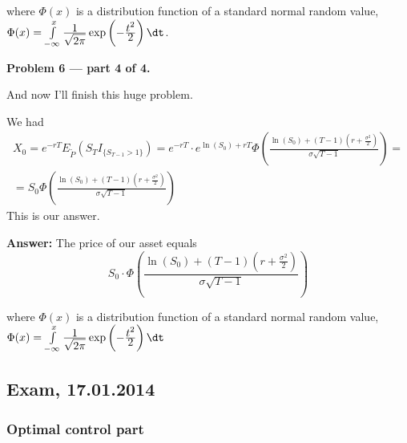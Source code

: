 \documentclass[12pt, a4paper]{article}
\newcommand{\ds}{\displaystyle}
\begin{document}
where $\Phi(x)$ is a distribution function of  a standard normal random value, $\Phi(x) = \int\limits_{-\infty}^{x}\frac{\ds 1}{\ds \sqrt{2\pi}}\exp\left(-\frac{\ds t^{2}}{\ds 2}\right)\dt$.


\textbf{Problem 6 — part 4 of 4.}\par
And now I'll finish this huge problem.\par
We had
\begin{multline}
X_{0} = e^{-rT}E_{\tilde{P}}\left(S_{T}I_{\{S_{T-1}> 1\}}\right) = e^{-rT}\cdot e^{\ln(S_{0}) + rT}\Phi\left(\frac{\ds \ln(S_{0}) + (T-1)\left(r + \frac{\ds \sigma^{2}}{\ds 2}\right)}{\ds \sigma\sqrt{T-1}}\right) = \\
=
S_{0}\Phi\left(\frac{\ds \ln(S_{0}) + (T-1)\left(r + \frac{\ds \sigma^{2}}{\ds 2}\right)}{\ds \sigma\sqrt{T-1}}\right)
\end{multline}
This is our answer.

\textbf{Answer:} The price of our asset equals
$$
S_{0}\cdot\Phi\left(\frac{\ds \ln(S_{0}) + (T-1)\left(r + \frac{\ds \sigma^{2}}{\ds 2}\right)}{\ds \sigma\sqrt{T-1}}\right)
$$\par
where $\Phi(x)$ is a distribution function of  a standard normal random value, $\Phi(x) = \int\limits_{-\infty}^{x}\frac{\ds 1}{\ds \sqrt{2\pi}}\exp\left(-\frac{\ds t^{2}}{\ds 2}\right)\dt$


\subsection{Exam, 17.01.2014}

\subsubsection*{Optimal control part}
\end{document}

